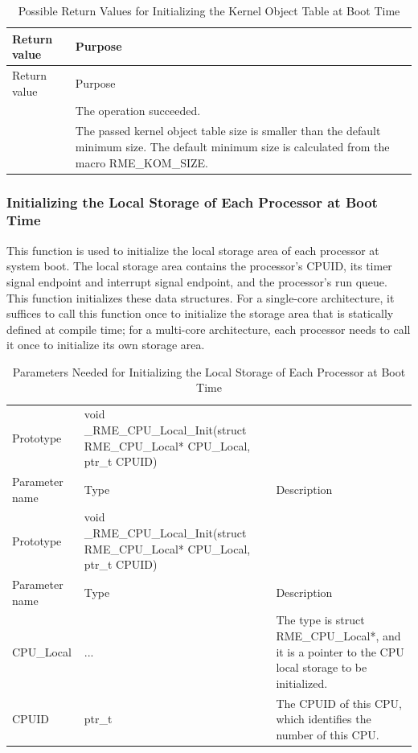 \begin{xltabular}{\textwidth}{@{}>{\hsize\raggedright\arraybackslash}X>{\hsize\raggedright\arraybackslash}X@{}}
\caption{Possible Return Values for Initializing the Kernel Object Table at Boot Time}\label{tab:7-39-init-kernel-object-table-at-boot-return-values}\\
\toprule
Return value & Purpose\tabularnewline
\endfirsthead
\toprule
Return value & Purpose\tabularnewline
\midrule
\endhead
\bottomrule
{} & The operation succeeded. & The passed kernel object table size is smaller than the default minimum size. The default minimum size is calculated from the macro RME\_KOM\_SIZE.\tabularnewline
\end{xltabular}
\nopagebreak[4]

\subsubsection{Initializing the Local Storage of Each Processor at Boot Time}\label{subsubsec:7-init-cpu-local-storage-at-boot}

This function is used to initialize the local storage area of each processor at system boot. The local storage area contains the processor's CPUID, its timer signal endpoint and interrupt signal endpoint, and the processor's run queue. This function initializes these data structures. For a single-core architecture, it suffices to call this function once to initialize the storage area that is statically defined at compile time; for a multi-core architecture, each processor needs to call it once to initialize its own storage area.

\begin{xltabular}{\textwidth}{@{}>{\hsize\raggedright\arraybackslash}X>{\hsize\raggedright\arraybackslash}X>{\hsize\raggedright\arraybackslash}X@{}}
\caption{Parameters Needed for Initializing the Local Storage of Each Processor at Boot Time}\label{tab:7-40-init-cpu-local-storage-at-boot-parameters}\\
\toprule
Prototype & void \_RME\_CPU\_Local\_Init(struct RME\_CPU\_Local* CPU\_Local,
ptr\_t CPUID) &\tabularnewline
Parameter name & Type & Description\tabularnewline
\endfirsthead
\toprule
Prototype & void \_RME\_CPU\_Local\_Init(struct RME\_CPU\_Local* CPU\_Local,
ptr\_t CPUID) &\tabularnewline
Parameter name & Type & Description\tabularnewline
\midrule
\endhead
\bottomrule
\endlastfoot
CPU\_Local & ... &
The type is struct RME\_CPU\_Local*, and it is a pointer to the CPU local storage to be initialized.\tabularnewline
CPUID & ptr\_t & The CPUID of this CPU, which identifies the number of this CPU.\tabularnewline
\end{xltabular}
\nopagebreak[4]

